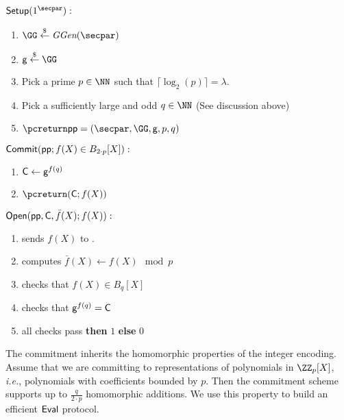 \documentclass{article}
\theoremstyle{definition}
\begin{document}
\begin{mdframed}[userdefinedwidth=\textwidth]
\begin{minipage}{\textwidth}
	\begin{flushleft}
	$\pro{Setup}(1^\secpar):$
		\begin{enumerate}[nolistsep]
			\item $ \GG \sample \ggen(\secpar)$
			\item $ \gr{g} \sample \GG$
			\item Pick a prime $p\in \NN$ such that $\lceil\log_2(p)\rceil=\lambda$.
			\item Pick a sufficiently large and odd $q\in \NN$ (See discussion above)
			\item $\pcreturn \params = (\secpar,\GG,\gr{g},p,q)$
		\end{enumerate}
	$\textsf{{Commit}}(\textsf{pp};f(X) \in B_{2\cdot p}[X]):$ 
		\begin{enumerate}[nolistsep]
			\item $\mathsf{C} \gets \mathsf{g}^{f(q)}$
			\item $\pcreturn (\gr{C};f(X))$
		\end{enumerate}
	$\textsf{{Open}}(\textsf{pp},\mathsf{C},\bar{f}(X);f(X)):$ 
		\begin{enumerate}[nolistsep]
		    \item \prover sends $f(X)$ to \verifier.
		    				\item \verifier computes $\bar{f}(X) \gets f(X) \mod p$
		    \item \verifier checks that $f(X)\in B_{q}[X]$
			\item \verifier checks that $\mathsf{g}^{f(q)} = \mathsf{C}$ 
			\item \pcif all checks pass \textbf{then} \pcreturn $1$ \textbf{else} \pcreturn $0$
		\end{enumerate}
		\end{flushleft}
\end{minipage}
\end{mdframed}
The commitment inherits the homomorphic properties of the integer encoding. Assume that we are committing to representations of polynomials in $\ZZ_p[X]$, \emph{i.e.}, polynomials with coefficients bounded by $p$. Then the commitment scheme supports up to $\frac{q}{2 \cdot p}$ homomorphic additions. We use this property to build an efficient $\textsf{{Eval}}$ protocol. 
\end{document}
